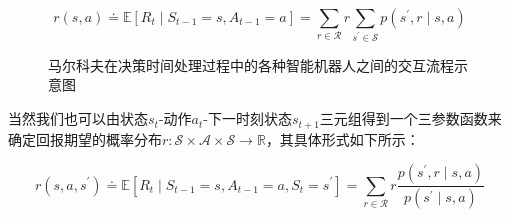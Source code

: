 \begin{equation}
    r(s, a) \doteq \mathbb{E}\left[R_{t} \mid S_{t-1}=s, A_{t-1}=a\right]=\sum_{r \in \mathcal{R}} r \sum_{s^{\prime} \in \mathcal{S}} p\left(s^{\prime}, r \mid s, a\right)
\end{equation}


\begin{figure}[!t]
	\centering
	\caption{马尔科夫在决策时间处理过程中的各种智能机器人之间的交互流程示意图}
	\label{Fig:MDP}
\end{figure}

当然我们也可以由状态$s_t$-动作$a_t$-下一时刻状态$s_{t+1}$三元组得到一个三参数函数来确定回报期望的概率分布$r:\mathcal{S} \times \mathcal{A} \times \mathcal{S} \rightarrow \mathbb{R}$，其具体形式如下所示：

\begin{equation}
    r\left(s, a, s^{\prime}\right) \doteq \mathbb{E}\left[R_{t} \mid S_{t-1}=s, A_{t-1}=a, S_{t}=s^{\prime}\right]=\sum_{r \in \mathcal{R}} r \frac{p\left(s^{\prime}, r \mid s, a\right)}{p\left(s^{\prime} \mid s, a\right)}
\end{equation}

